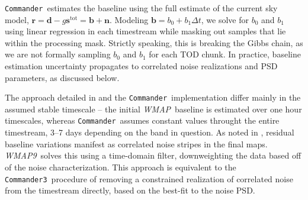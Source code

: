 \documentclass[twocolumn]{../../common/aa}
\def\WMAP{\emph{WMAP}}
\def\WMAPnine{\emph{WMAP9}}
\def\wmap{\emph{WMAP}}
\def\planck{\emph{Planck}}
\def\commander{\texttt{Commander}}
\def\commanderthree{\texttt{Commander3}}
\newcommand{\K}[0]{\textit K}
\newcommand{\Q}[0]{\textit Q}
\begin{document}
\commander\ estimates the baseline using the full estimate of the current sky
model, $\boldsymbol r=\boldsymbol d-g\boldsymbol s^\mathrm{tot}=\boldsymbol
b+\boldsymbol n$. Modeling $\boldsymbol b=b_0+b_1\Delta t$, we solve for $b_0$
and $b_1$ using linear regression in each timestream while masking out samples
that lie within the processing mask. Strictly speaking, this is breaking the
Gibbs chain, as we are not formally sampling $b_0$ and $b_1$ for each TOD
chunk. In practice, baseline estimation uncertainty propagates to correlated
noise realizations and PSD parameters, as discussed below.

The approach detailed in \citet{hinshaw2003a} and the \commander\
implementation differ mainly in the assumed stable timescale -- the initial
\WMAP\ baseline is estimated over one hour timescales, whereas \commander\
assumes constant values throught the entire timestream, 3--7 days depending on
the band in question. As noted in \citet{hinshaw2003a}, residual baseline
variations manifest as correlated noise stripes in the final maps. \WMAPnine\
solves this using a time-domain filter, downweighting the data based off of the
noise characterization. This approach is equivalent to the \commanderthree\
procedure of removing a constrained realization of correlated noise from the
timestream directly, based on the best-fit to the noise PSD.







\end{document}
